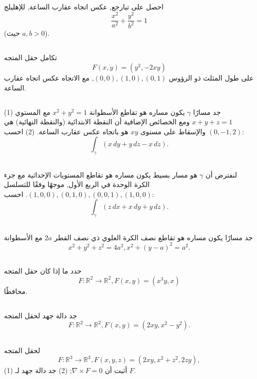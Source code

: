 \subsection{}
احصل على تبارجع, عكس اتجاه عقارب الساعة, للإهليلج
\[ \frac{x^2}{a^2} + \frac{y^2}{b^2} = 1 \] 
(حيث \( a, b > 0 \)).

\subsection{}
تكامل حقل المتجه
\[ F(x, y) = (y^2, -2xy) \]
على طول المثلث ذو الرؤوس \((0, 0), (1, 0), (0, 1)\), مع الاتجاه عكس اتجاه عقارب الساعة.

\subsection{}
(1) جد مسارًا \( \gamma \) يكون مساره هو تقاطع الأسطوانة \( x^2 + y^2 = 1 \) مع المستوي \( x + y + z = 1 \) ومع الخصائص الإضافية أن النقطة الابتدائية (والنقطة النهائية) هي \((0, -1, 2)\) والإسقاط على مستوى \( xy \) هو باتجاه عكس عقارب الساعة.
(2) احسب:
\[ \int_{\gamma} (x \, dy + y \, dz - x \, dz). \]

\subsection{}
لنفترض أن \( \gamma \) هو مسار بسيط يكون مساره هو تقاطع المستويات الإحداثية مع جزء الكرة الوحدة في الربع الأول, موجهًا وفقًا للتسلسل \((1, 0, 0), (0, 1, 0), (0, 0, 1), (1, 0, 0)\). احسب:
\[ \int_{\gamma} (z \, dx + x \, dy + y \, dz). \]
\subsection{}
جد مسارًا يكون مساره هو تقاطع نصف الكرة العلوي ذي نصف القطر \( 2a \) مع الأسطوانة
\[ x^2 + y^2 + z^2 = 4a^2, x^2 + (y - a)^2 = a^2. \]

\subsection{}
حدد ما إذا كان حقل المتجه
\[ F : \mathbb{R}^2 \to \mathbb{R}^2, F(x, y) = (x^3y, x) \]
محافظًا.
\subsection{}
جد دالة جهد لحقل المتجه
\[ F : \mathbb{R}^2 \to \mathbb{R}^2, F(x, y) = (2xy, x^2 - y^2). \]
\subsection{}
لحقل المتجه
\[ F : \mathbb{R}^3 \to \mathbb{R}^3, F(x, y, z) = (2xy, x^2 + z^2, 2zy), \]
(1) أثبت أن \( \nabla \times F = 0 \);
(2) جد دالة جهد لـ \( F \).
